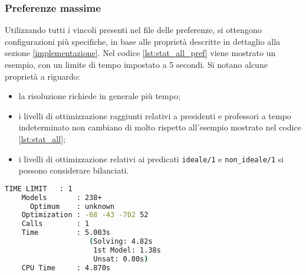 \subsubsection*{Preferenze massime}
Utilizzando tutti i vincoli presenti nel file delle preferenze, si ottengono 
configurazioni più specifiche, in base alle proprietà descritte in dettaglio
alla sezione \ref{implementazione}. 
Nel codice \ref{lst:stat_all_pref} viene mostrato un esempio, con un limite 
di tempo impostato a 5 secondi. Si notano alcune proprietà a riguardo:
\begin{itemize}
    \item la risoluzione richiede in generale più tempo;
    \item i livelli di ottimizzazione raggiunti relativi a presidenti e 
        professori a tempo indeterminato non cambiano di molto rispetto 
        all'esempio mostrato nel codice \ref{lst:stat_all};
    \item i livelli di ottimizzazione relativi ai predicati \texttt{ideale/1} e 
        \texttt{non\_ideale/1} si possono considerare bilanciati.
\end{itemize}

\begin{lstlisting}[language=bash, captionpos=b, 
    caption={Statistiche clingo per tutti i corsi con preferenze massime.}, 
    label={lst:stat_all_pref},
    backgroundcolor=\color{lightgray!20},
    basicstyle=\ttfamily\footnotesize]
    TIME LIMIT   : 1
    Models       : 238+
      Optimum    : unknown
    Optimization : -68 -43 -702 52
    Calls        : 1
    Time         : 5.003s 
                    (Solving: 4.82s 
                     1st Model: 1.38s 
                     Unsat: 0.00s)
    CPU Time     : 4.870s
\end{lstlisting}
